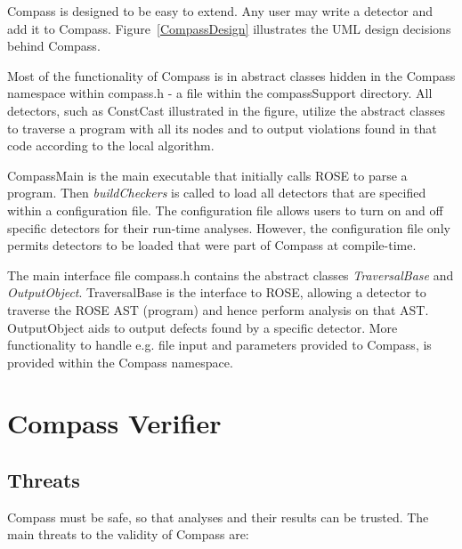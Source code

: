 Compass is designed to be easy to extend. Any user may write a detector and add it to Compass. Figure~\ref{CompassDesign}
illustrates the UML design decisions behind Compass.


Most of the functionality of Compass is in abstract classes hidden in the Compass namespace within compass.h - a file within
the compassSupport directory. All detectors, such as ConstCast illustrated in the figure, utilize the abstract classes
to traverse a program with all its nodes and to output violations found in that code according to the local algorithm.

CompassMain is the main executable that initially calls ROSE to parse a program. Then \emph{buildCheckers} is called to
load all detectors that are specified within a configuration file. The configuration file allows users to turn on and off
specific detectors for their run-time analyses. However, the configuration file only permits detectors to be loaded that 
were part of Compass at compile-time.

The main interface file compass.h contains the abstract classes \emph{TraversalBase} and 
\emph{OutputObject}. TraversalBase is the interface to ROSE, allowing a detector to traverse the ROSE AST (program) and hence
perform analysis on that AST. OutputObject aids to output defects found by a specific detector. More functionality to handle
e.g. file input and parameters provided to Compass, is provided within the Compass namespace.


\section{Compass Verifier}

\subsection{Threats} 

Compass must be safe, so that analyses and their results can be trusted. 
The main threats to the validity of Compass are:

